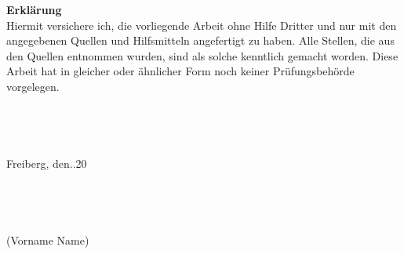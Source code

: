 	\pagestyle{fancy}
	
	\begin{titlepage}
		
		{\LARGE \textbf{Erklärung}}\\
		
		Hiermit versichere ich, die vorliegende Arbeit ohne Hilfe Dritter und nur mit den angegebenen
		Quellen und Hilfsmitteln angefertigt zu haben. Alle Stellen, die aus den Quellen entnommen
		wurden, sind als solche kenntlich gemacht worden. Diese Arbeit hat in gleicher oder ähnlicher
		Form noch keiner Prüfungsbehörde vorgelegen.\\
		\\
		\\
		\\
		\\
		Freiberg, den\underline{\quad \quad}.\underline{\quad \quad}.20\underline{\quad \quad}\\
		\\
		\\
		\\
		\underline{\qquad \qquad \qquad \qquad \qquad \quad} \\
		(Vorname Name)
		
	\end{titlepage}
